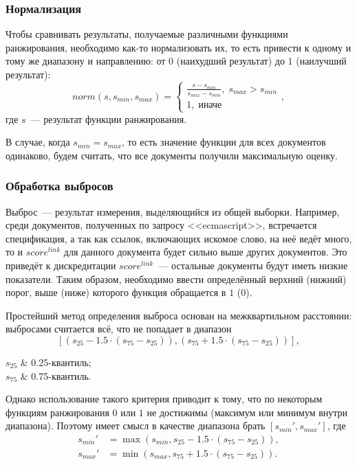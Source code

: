 \subsubsection{Нормализация} \label{sssec:normalization}
Чтобы сравнивать результаты, получаемые различными функциями ранжирования, необходимо как-то нормализовать их, то есть привести к одному и тому же диапазону и направлению: от $0$ (наихудший результат) до $1$ (наилучший результат):
\begin{equation} \label{eq:simple-norm}
  norm(s, s_{min}, s_{max}) = \begin{cases}
    \frac{s-s_{min}}{s_{max} - s_{min}}, \; s_{max} > s_{min}\\
    1, \; \text{иначе}
  \end{cases},
\end{equation}
где $s$~--- результат функции ранжирования.

В случае, когда $s_{min}=s_{max}$, то есть значение функции для всех документов одинаково, будем считать, что все документы получили максимальную оценку.


\subsubsection{Обработка выбросов} \label{sssec:outlier}
Выброс~--- результат измерения, выделяющийся из общей выборки. Например, среди документов, полученных по запросу <<ecmascript>>, встречается спецификация, а так как ссылок, включающих искомое слово, на неё ведёт много, то и $score^{link}$ для данного документа будет сильно выше других документов. Это приведёт к дискредитации $score^{link}$~--- остальные документы будут иметь низкие показатели. Таким образом, необходимо ввести определённый верхний (нижний) порог, выше (ниже) которого функция обращается в $1$ ($0$).

Простейший метод определения выброса основан на межквартильном расстоянии: выбросами считается всё, что не попадает в диапазон
\begin{equation}
  \left[(s_{25}-1.5\cdot (s_{75}-s_{25})), (s_{75}+1.5\cdot (s_{75}-s_{25}))\right],
\end{equation}
\begin{conditions}
  $s_{25}$ & 0.25-квантиль;\\
  $s_{75}$ & 0.75-квантиль.
\end{conditions}

Однако использование такого критерия приводит к тому, что по некоторым функциям ранжирования $0$ или $1$ не достижимы (максимум или минимум внутри диапазона). Поэтому имеет смысл в качестве диапазона брать $[s_{min}', s_{max}']$, где
\begin{equation}
  \begin{split}
    s_{min}'&=\max(s_{min}, s_{25}-1.5\cdot (s_{75}-s_{25})),\\
    s_{max}'&=\min(s_{max}, s_{75}+1.5\cdot (s_{75}-s_{25})).
  \end{split}
\end{equation}


